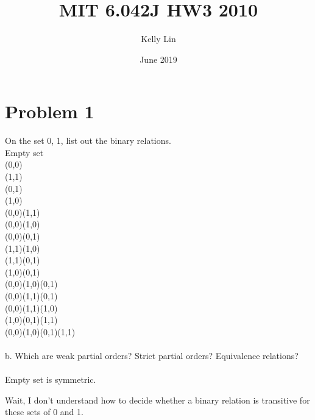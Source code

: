 \documentclass{article}
\title{MIT 6.042J HW3 2010}
\author{ Kelly Lin }
\date{June 2019}
\begin{document}
\maketitle

\section{Problem 1}
On the set {0, 1}, list out the binary relations. 
\\
Empty set
\\
(0,0)
\\
(1,1)
\\
(0,1)
\\
(1,0)
\\
(0,0)(1,1)
\\
(0,0)(1,0)
\\
(0,0)(0,1)
\\
(1,1)(1,0)
\\
(1,1)(0,1)
\\
(1,0)(0,1)
\\
(0,0)(1,0)(0,1)
\\
(0,0)(1,1)(0,1)
\\
(0,0)(1,1)(1,0)
\\
(1,0)(0,1)(1,1)
\\
(0,0)(1,0)(0,1)(1,1)
\\\\
b. Which are weak partial orders? Strict partial orders? Equivalence relations?
\\\\
Empty set is symmetric. 

Wait, I don't understand how to decide whether a binary relation is transitive for these sets of 0 and 1. 
\end{document}
